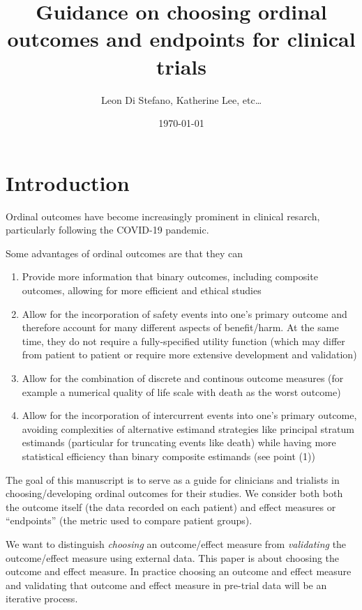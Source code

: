\documentclass[
  11pt,
  fleqn
]{article}
\title{Guidance on choosing ordinal outcomes and endpoints for clinical trials}
\author{Leon Di Stefano, Katherine Lee, etc\ldots}
\date{\today}
\begin{document}
\maketitle

\tableofcontents

\section{Introduction}

Ordinal outcomes have become increasingly prominent in clinical
resarch, particularly following the COVID-19 pandemic.

Some advantages of ordinal outcomes are that they can
\begin{enumerate}
  \item Provide more information that binary outcomes, including
    composite outcomes, allowing for more efficient and ethical studies
  \item Allow for the incorporation of safety events into one's
    primary outcome and therefore account for many different aspects
    of benefit/harm. At the same time, they do not require a
    fully-specified utility function (which may differ from patient
    to patient or require more extensive development and validation)
  \item Allow for the combination of discrete and continous outcome
    measures (for example a numerical quality of life scale with
    death as the worst outcome)
  \item Allow for the incorporation of intercurrent events into one's
    primary outcome, avoiding complexities of alternative estimand strategies
    like principal stratum estimands (particular for truncating
    events like death) while having more statistical efficiency than
    binary composite estimands (see point (1))
\end{enumerate}

The goal of this manuscript is to serve as a guide for clinicians and trialists
in choosing/developing ordinal outcomes for their studies. We consider both
both the outcome itself (the data recorded on each patient) and effect
measures or ``endpoints'' (the metric used to compare patient groups).

We want to distinguish \emph{choosing} an outcome/effect
measure from \emph{validating} the outcome/effect measure using
external data. This paper is about choosing the outcome and effect
measure. In practice choosing an outcome and effect measure and
validating that outcome and effect measure in pre-trial data will be
an iterative process.
\end{document}
